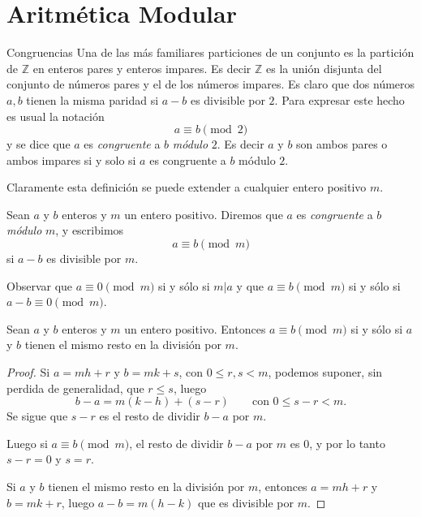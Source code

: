 \chapter[Aritmética Modular]{Aritmética Modular}\label{cap.aritmetica_modular}

\begin{section}{Congruencias}\label{seccion-congruencias}
Una de las más familiares particiones de un conjunto es la partición de $\mathbb Z$ en enteros pares y enteros impares. Es decir $\mathbb Z$ es la unión disjunta del conjunto de números pares y el de los números impares. Es claro que dos números $a,b$ tienen la misma paridad si $a-b$ es divisible por $2$. Para expresar este hecho es usual la notación
$$
a\equiv b \pmod2
$$
y se dice que $a$ es \textit{congruente } a $b$ \textit{módulo} $2$. Es decir $a$ y $b$ son ambos pares o ambos impares si y solo si $a$ es congruente a $b$ módulo $2$.

Claramente esta definición se puede extender a cualquier entero positivo $m$.

\begin{definicion} Sean $a$ y $b$ enteros y $m$ un entero positivo. Diremos que $a$ es {\em congruente} a $b$  {\em módulo} $m$, y escribimos  
$$
a \equiv b \pmod{m}
$$
si $a-b$ es divisible por $m$.
\end{definicion}

Observar que $a\equiv 0 \pmod{m}$ si  y sólo si $m|a$ y que $a\equiv b \pmod{m}$ si y sólo si $a-b\equiv 0 \pmod{m}$. 


\begin{proposicion}
Sean $a$ y $b$ enteros y $m$ un entero positivo. Entonces $a\equiv b \pmod{m}$ si  y sólo si $a$ y $b$ tienen el mismo resto en la división por $m$.
\end{proposicion}
\begin{proof}
Si $a=mh+r$ y $b=mk+s$, con $0 \le r,s <m$, podemos suponer, sin perdida de generalidad, que $r \le s$, luego
$$
b-a= m(k-h) + (s-r) \qquad \text{con $0\le s - r < m$}.
$$
Se sigue que $s-r$ es el resto de dividir $b-a$ por $m$.

Luego si $a\equiv b \pmod{m}$, el resto de dividir   $b-a$ por $m$ es $0$, y por lo tanto $s-r=0$ y $s=r$.

Si $a$ y $b$ tienen el mismo resto en la división por $m$, entonces  $a=mh+r$ y $b=mk+r$, luego $a-b = m(h-k)$ que es divisible por $m$.
\end{proof}


\end{section}
